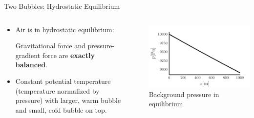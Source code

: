 \documentclass[aspectratio=169]{beamer}
\begin{document}
\begin{frame}{Two Bubbles: Hydrostatic Equilibrium}
  \begin{columns}
    \begin{column}[t]{0.5\textwidth}
      \begin{itemize}
      \item Air is in hydrostatic equilibrium:

  Gravitational force and pressure-gradient force are \textbf{exactly balanced}.

  \item Constant potential temperature (temperature normalized by pressure) with larger, warm bubble and small, cold bubble on top.
  \end{itemize}
    \end{column}~%
    \begin{column}[t]{0.5\textwidth}
      \begin{center}
         {
          \includegraphics[trim={0 0 0 0.5cm}, clip]{ppam_hydrostatic}
        }
Background pressure in equilibrium
\end{center}
    \end{column}
  \end{columns}
\end{frame}
\end{document}
